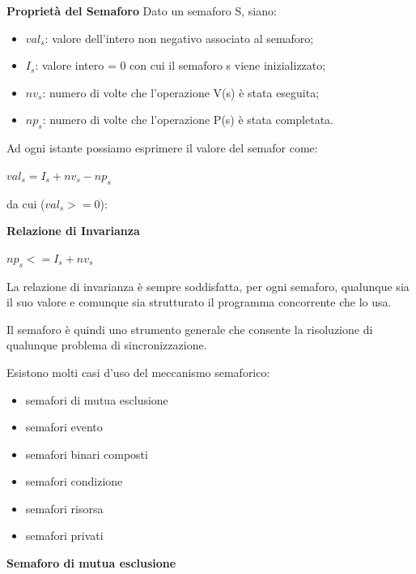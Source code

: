 \documentclass{article}
\begin{document}
\vspace{5mm}
\textbf{Proprietà del Semaforo}
\vspace{3mm}
Dato un semaforo S, siano:
\begin{itemize}
    \item \textbf{$val_s$}: valore dell'intero non negativo associato al semaforo;
    \item \textbf{$I_s$}: valore intero \>= 0 con cui il semaforo s viene inizializzato;
    \item \textbf{$nv_s$}: numero di volte che l'operazione V(s) è stata eseguita;
    \item \textbf{$np_s$}: numero di volte che l'operazione P(s) è stata completata.
\end{itemize}

\vspace{3mm}
Ad ogni istante possiamo esprimere il valore del semafor come:
\begin{center}
    $val_s = I_s + nv_s - np_s$
\end{center}

da cui ($val_s >= 0$):

\begin{center}
    \textbf{Relazione di Invarianza}

    \textbf{$np_s <= I_s + nv_s$}
\end{center}

La relazione di invarianza è sempre soddisfatta, per ogni semaforo, qualunque sia il suo valore e comunque sia strutturato il programma concorrente che lo usa.

\vspace{5mm}
Il semaforo è quindi uno strumento generale che consente la risoluzione di qualunque problema di sincronizzazione.

Esistono molti casi d'uso del meccanismo semaforico:
\begin{itemize}
    \item semafori di mutua esclusione
    \item semafori evento
    \item semafori binari composti
    \item semafori condizione
    \item semafori risorsa
    \item semafori privati
\end{itemize}

\vspace{5mm}
\textbf{Semaforo di mutua esclusione}
\end{document}
